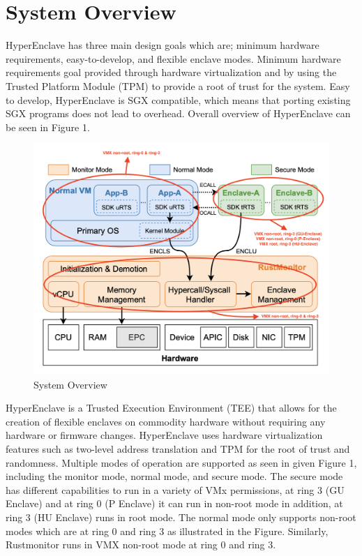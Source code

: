 \section{System Overview}
HyperEnclave has three main design goals which are; minimum hardware requirements, easy-to-develop, and flexible enclave modes. Minimum hardware requirements goal provided through hardware virtualization and by using the Trusted Platform Module (TPM) to provide a root of trust for the system. Easy to develop, HyperEnclave is SGX compatible, which means that porting existing SGX programs does not lead to overhead.
\newline
Overall overview of HyperEnclave can be seen in Figure 1. 
\begin{figure}[H]
    \centerline{\includegraphics[scale=.42]{figures/system_overview.png}}
    \caption{System Overview}
    \label{fig}
\end{figure}

\noindent
HyperEnclave is a Trusted Execution Environment (TEE) that allows for the creation of flexible enclaves on commodity hardware without requiring any hardware or firmware changes. HyperEnclave uses hardware virtualization features such as two-level address translation and TPM for the root of trust and randomness.
Multiple modes of operation are supported as seen in given Figure 1, including the monitor mode, normal mode, and secure mode. The secure mode has different capabilities to run in a variety of VMx permissions, at ring 3 (GU Enclave) and at ring 0 (P Enclave) it can run in non-root mode in addition, at ring 3 (HU Enclave) runs in root mode. The normal mode only supports non-root modes which are at ring 0 and ring 3 as illustrated in the Figure. Similarly, Rustmonitor runs in VMX non-root mode at ring 0 and ring 3. 

